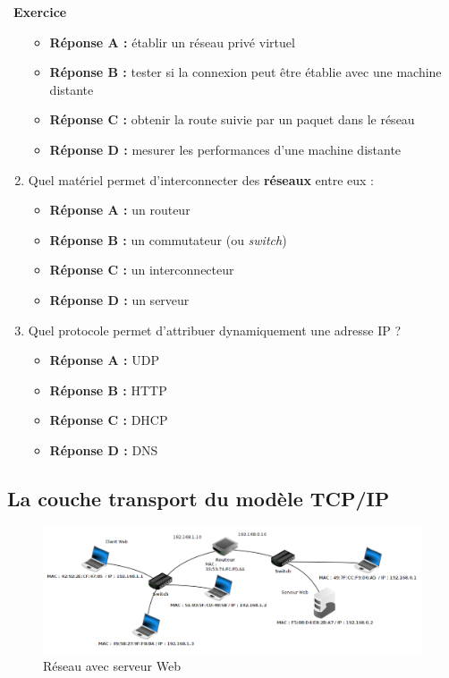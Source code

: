 \documentclass[
  11pt,
]{article}
\providecommand{\tightlist}{%
  \setlength{\itemsep}{0pt}\setlength{\parskip}{0pt}}
\newcounter{exo}
\newenvironment{exercice}[1]
{\par \medskip   \addtocounter{exo}{1} \noindent  
\begin{bclogo}[arrondi =0.1,   noborder = true, logo=\bccrayon, marge=4]{~\textbf{Exercice} \textbf{\theexo} {\itshape #1} }  \par}
{
\end{bclogo}
 \par \bigskip }
\begin{document}
\begin{exercice}{}
\begin{enumerate}
  \begin{itemize}
  \tightlist
  \item
    \textbf{Réponse A :} établir un réseau privé virtuel
  \item
    \textbf{Réponse B :} tester si la connexion peut être établie avec
    une machine distante
  \item
    \textbf{Réponse C :} obtenir la route suivie par un paquet dans le
    réseau
  \item
    \textbf{Réponse D :} mesurer les performances d'une machine distante
  \end{itemize}
\item
  Quel matériel permet d'interconnecter des \textbf{réseaux} entre eux :

  \begin{itemize}
  \tightlist
  \item
    \textbf{Réponse A :} un routeur
  \item
    \textbf{Réponse B :} un commutateur (ou \emph{switch})
  \item
    \textbf{Réponse C :} un interconnecteur
  \item
    \textbf{Réponse D :} un serveur
  \end{itemize}
\item
  Quel protocole permet d'attribuer dynamiquement une adresse IP ?

  \begin{itemize}
  \tightlist
  \item
    \textbf{Réponse A :} UDP
  \item
    \textbf{Réponse B :} HTTP
  \item
    \textbf{Réponse C :} DHCP
  \item
    \textbf{Réponse D :} DNS
  \end{itemize}
\end{enumerate}

\end{exercice}

\hypertarget{la-couche-transport-du-moduxe8le-tcpip}{%
\subsection{La couche transport du modèle
TCP/IP}\label{la-couche-transport-du-moduxe8le-tcpip}}

\begin{figure}
\centering
\includegraphics{images/wlan3.png}
\caption{Réseau avec serveur Web}
\end{figure}
\end{document}
